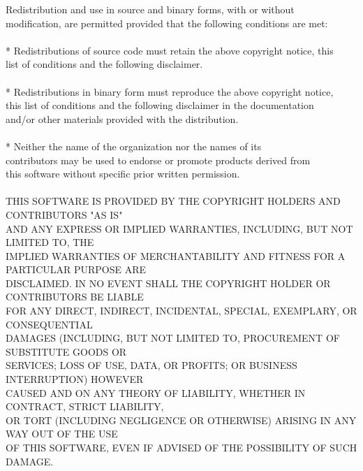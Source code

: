 \documentclass{article}
\begin{document}
    Redistribution and use in source and binary forms, with or without\\
    modification, are permitted provided that the following conditions are met:\\
\\
    * Redistributions of source code must retain the above copyright notice, this\\
      list of conditions and the following disclaimer.\\
\\
    * Redistributions in binary form must reproduce the above copyright notice,\\
      this list of conditions and the following disclaimer in the documentation\\
      and/or other materials provided with the distribution.\\
\\
    * Neither the name of the {organization} nor the names of its\\
      contributors may be used to endorse or promote products derived from\\
      this software without specific prior written permission.\\
\\
    THIS SOFTWARE IS PROVIDED BY THE COPYRIGHT HOLDERS AND CONTRIBUTORS "AS IS"\\
    AND ANY EXPRESS OR IMPLIED WARRANTIES, INCLUDING, BUT NOT LIMITED TO, THE\\
    IMPLIED WARRANTIES OF MERCHANTABILITY AND FITNESS FOR A PARTICULAR PURPOSE ARE\\
    DISCLAIMED. IN NO EVENT SHALL THE COPYRIGHT HOLDER OR CONTRIBUTORS BE LIABLE\\
    FOR ANY DIRECT, INDIRECT, INCIDENTAL, SPECIAL, EXEMPLARY, OR CONSEQUENTIAL\\
    DAMAGES (INCLUDING, BUT NOT LIMITED TO, PROCUREMENT OF SUBSTITUTE GOODS OR\\
    SERVICES; LOSS OF USE, DATA, OR PROFITS; OR BUSINESS INTERRUPTION) HOWEVER\\
    CAUSED AND ON ANY THEORY OF LIABILITY, WHETHER IN CONTRACT, STRICT LIABILITY,\\
    OR TORT (INCLUDING NEGLIGENCE OR OTHERWISE) ARISING IN ANY WAY OUT OF THE USE\\
    OF THIS SOFTWARE, EVEN IF ADVISED OF THE POSSIBILITY OF SUCH DAMAGE.\\
\end{document}
